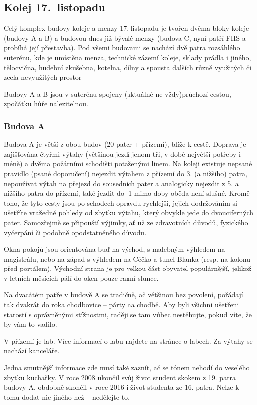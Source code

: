 ﻿\subsection{Kolej 17.~listopadu}

Celý komplex budovy koleje a menzy 17. listopadu je tvořen dvěma bloky koleje (budovy A a B) a budovou dnes již
bývalé menzy (budova C, nyní patří FHS a probíhá její přestavba). Pod všemi
budovami se nachází dvě patra rozsáhlého suterénu, kde je umístěna menza,
technické zázemí koleje, sklady prádla i jiného, tělocvična, hudební zkušebna,
kotelna, dílny a spousta dalších různě využitých či zcela nevyužitých prostor

Budovy A a B jsou v suterénu spojeny (aktuálně ne vždy)průchozí cestou, zpočátku hůře
nalezitelnou. 

\subsubsection{Budova A}
Budova A je větší z obou budov (20 pater + přízemí), blíže k cestě. Doprava je
zajišťována čtyřmi výtahy (většinou jezdí jenom tři, v době největší potřeby i
méně) a dvěma požárními schodišti potaženými linem. Na koleji existuje nepsané pravidlo (psané doporučení)
nejezdit výtahem z přízemí do 3. (a nižšího) patra, nepoužívat výtah na přejezd
do sousedních pater a analogicky nejezdit z 5. a nižšího patra do přízemí, také
jezdit do -1 mimo doby oběda není slušné. Kromě toho, že tyto cesty jsou po
schodech opravdu rychlejší, jejich dodržováním si ušetříte vražedné pohledy od
zbytku výtahu, který obvykle jede do dvouciferných pater. Samozřejmě se
připouští výjimky, ať už ze zdravotních důvodů, fyzického vyčerpání či podobně
opodstatněného důvodu.

Okna pokojů jsou orientována buď na východ, s malebným výhledem na magistrálu,
nebo na západ s výhledem na Céčko a tunel Blanka (resp. na kolonu před
portálem). Východní strana je pro velkou část obyvatel populárnější, jelikož v
letních měsících pálí do oken pouze ranní slunce.

Na dvacátém patře v budově A se tradičně, ač většinou bez
povolení, pořádají tak dvakrát do roka chodbovice – párty na chodbě. Aby byli
všichni ušetřeni starostí s oprávněnými stížnostmi, raději se tam vůbec
nestěhujte, pokud víte, že by vám to vadilo.

V přízemí je lab.
Více informací o labu najdete na stránce o labech. Za výtahy se nachází
kanceláře.

Jedna smutnější informace zde musí také zaznít, ač se tónem nehodí do veselého
zbytku kuchařky. V roce 2008 ukončil svůj život student skokem z 19. patra
budovy A, obdobně skončil v roce 2016 i život studenta ze 16. patra. Nelze k
tomu dodat nic jiného než – nedělejte to.


